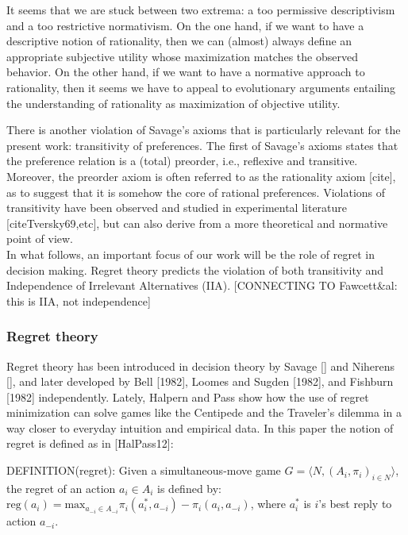 \documentclass[fleqn,reqno,11pt]{article}
\begin{document}
It seems that we are stuck between two extrema: a too permissive descriptivism and a too restrictive normativism. On the one hand, if we want to have a
descriptive notion of rationality, then we can (almost) always define an appropriate
subjective utility whose maximization matches the observed behavior. On the other hand, if we
want to have a normative approach to rationality, then it seems we have to appeal to
evolutionary arguments entailing the understanding of rationality as maximization of objective
utility.


There is another violation of Savage's axioms that is particularly relevant for the present work: transitivity of preferences. The first of Savage's axioms states that the preference relation is a (total) preorder, i.e., reflexive and transitive. Moreover, the preorder axiom is often referred to as the rationality axiom [cite], as to suggest that it is somehow the core of rational preferences. Violations of transitivity have been observed and studied in experimental literature [citeTversky69,etc], but can also derive from a more theoretical and normative point of view. \\
In what follows, an important focus of our work will be the role of regret in decision making. Regret theory predicts the violation of both transitivity and Independence of Irrelevant Alternatives (IIA). [CONNECTING TO Fawcett\&al: this is IIA, not independence]




\subsubsection{Regret theory}

Regret theory has been introduced in decision theory by Savage [] and Niherens [], and later developed by Bell [1982], Loomes and Sugden [1982], and Fishburn [1982] independently. Lately, Halpern and Pass show how the use of regret minimization can solve games like the Centipede and the Traveler's dilemma in a way closer to everyday intuition and empirical data. In this paper the notion of regret is defined as in [HalPass12]:

DEFINITION(regret): Given a simultaneous-move game $ G=\langle N, (A_i , \pi_i)_{i \in N} \rangle $, the regret of an action $a_i \in A_i$ is defined by: $\text{reg}(a_i)= \text{max}_{a_{-i}\in A_{-i}} \pi_i(a_i^*,a_{-i})-\pi_i(a_i,a_{-i}) $, where $a_i^*$ is $i$'s best reply to action $a_{-i} $.\\
\end{document}
